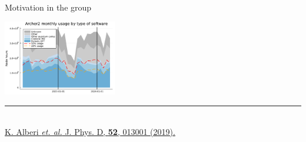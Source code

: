 \begin{frame}{Motivation in the \matmat group}
\begin{center}
        \hspace{1.5em}
        \includegraphics[height=3.3cm]{img/intro/archer_usage.pdf}
    \end{center}
   \vspace{-1.3em}
   \rule{4.5cm}{0.5pt}\\[-0.5em]
   {\tiny \href{http://dx.doi.org/10.1088/1361-6463/aad926}{%
       K. Alberi \textit{et. al.} J. Phys. D, \textbf{52}, 013001 (2019).}}
\end{frame}


